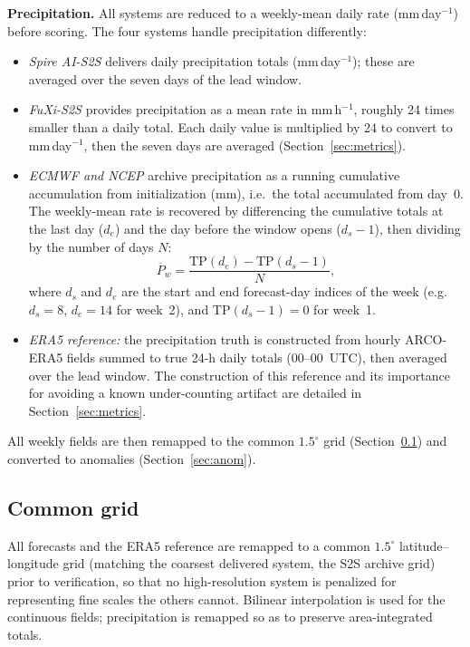 \documentclass[11pt]{article}
\begin{document}
\textbf{Precipitation.}
All systems are reduced to a weekly-mean daily rate (mm\,day$^{-1}$)
before scoring. The four systems handle precipitation differently:
\begin{itemize}
  \item \textit{Spire AI-S2S} delivers daily precipitation totals
    (mm\,day$^{-1}$); these are averaged over the seven days of the
    lead window.
  \item \textit{FuXi-S2S} provides precipitation as a mean rate in
    mm\,h$^{-1}$, roughly 24 times smaller than a daily total.
    Each daily value is multiplied by 24 to convert to
    mm\,day$^{-1}$, then the seven days are averaged
    (Section~\ref{sec:metrics}).
  \item \textit{ECMWF and NCEP} archive precipitation as a running
    cumulative accumulation from initialization (mm), i.e.\ the total
    accumulated from day~0. The weekly-mean rate is recovered by
    differencing the cumulative totals at the last day ($d_e$) and the
    day before the window opens ($d_s - 1$), then dividing by the
    number of days $N$:
    \begin{equation}
      \overline{P}_{w} = \frac{\mathrm{TP}(d_e) - \mathrm{TP}(d_s-1)}{N},
      \label{eq:deaccum}
    \end{equation}
    where $d_s$ and $d_e$ are the start and end forecast-day indices
    of the week (e.g.\ $d_s=8$, $d_e=14$ for week~2), and
    $\mathrm{TP}(d_s-1)=0$ for week~1.
  \item \textit{ERA5 reference:} the precipitation truth is constructed
    from hourly ARCO-ERA5 fields summed to true 24-h daily totals
    (00--00~UTC), then averaged over the lead window. The construction
    of this reference and its importance for avoiding a known
    under-counting artifact are detailed in Section~\ref{sec:metrics}.
\end{itemize}
All weekly fields are then remapped to the common $1.5^{\circ}$ grid
(Section~\ref{sec:grid}) and converted to anomalies
(Section~\ref{sec:anom}).

\subsection{Common grid}\label{sec:grid}

All forecasts and the ERA5 reference are remapped to a common
$1.5^{\circ}$ latitude--longitude grid (matching the coarsest delivered
system, the S2S archive grid) prior to verification, so that no
high-resolution system is penalized for representing fine scales the
others cannot. Bilinear interpolation is used for the continuous fields;
precipitation is remapped so as to preserve area-integrated totals.
\end{document}
